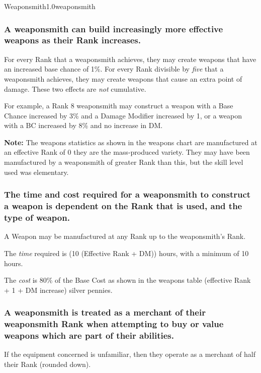 \begin{skill}{Weaponsmith}{1.0}{weaponsmith}
\subsubsection{A weaponsmith can build increasingly more effective
weapons as their Rank increases.}

For every Rank that a weaponsmith achieves, they may create weapons
that have an increased base chance of 1\%.  For every Rank divisible
by \emph{five} that a weaponsmith achieves, they may create weapons
that cause an extra point of damage.  These two effects are \emph{not}
cumulative.

For example, a Rank 8 weaponsmith may construct a weapon with a Base
Chance increased by 3\% and a Damage Modifier increased by 1, or a
weapon with a BC increased by 8\% and no increase in DM.

\textbf{Note:} The weapons statistics as shown in the weapons chart are
manufactured at an effective Rank of 0 \ie they are the mass-produced
variety.  They may have been manufactured by a weaponsmith of greater
Rank than this, but the skill level used was elementary.

\subsubsection{The time and cost required for a weaponsmith to
construct a weapon is dependent on the Rank that is used, and the type
of weapon.}

A Weapon may be manufactured at any Rank up to the weaponsmith's Rank.
\begin{Enumerate}
\item
The \emph{time} required is (10 \x (Effective Rank + DM)) hours, with
a minimum of 10 hours.

\item
The \emph{cost} is 80\% of the Base Cost as shown in the weapons table
\x (effective Rank + 1 + DM increase) silver pennies.
\end{Enumerate}

\subsubsection{A weaponsmith is treated as a merchant of their
weaponsmith Rank when attempting to buy or value weapons which are
part of their abilities.}

If the equipment concerned is unfamiliar, then they operate as a
merchant of half their Rank (rounded down).


\end{skill}
